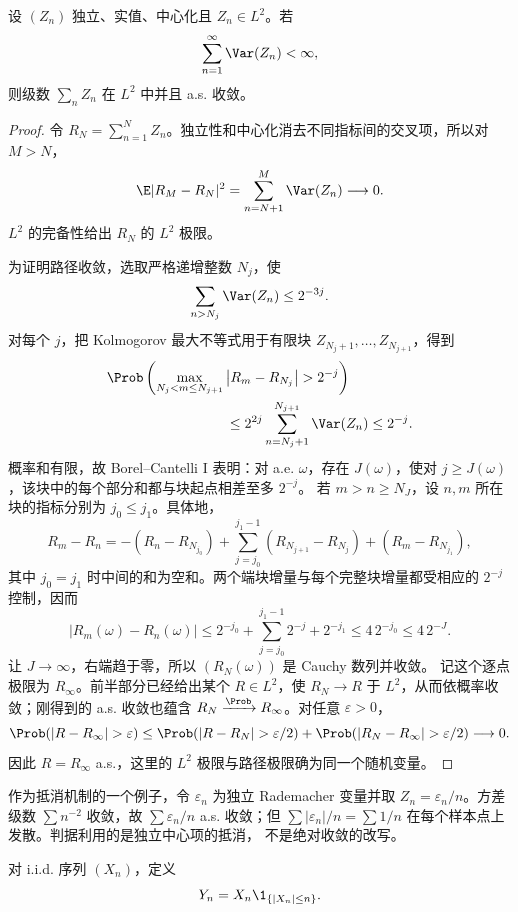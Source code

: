 \begin{theorem}\label{theorem:5-4-2-kolmogorov-series}
设 $(Z_n)$ 独立、实值、中心化且 $Z_n\in L^2$。若
\[
 \sum_{n=1}^{\infty}\Var(Z_n)<\infty,
\]
则级数 $\sum_nZ_n$ 在 $L^2$ 中并且 a.s. 收敛。
\end{theorem}

\begin{proof}
令 $R_N=\sum_{n=1}^NZ_n$。独立性和中心化消去不同指标间的交叉项，所以对 $M>N$，
\[
 \E|R_M-R_N|^2=\sum_{n=N+1}^M\Var(Z_n)\longrightarrow0.
\]
$L^2$ 的完备性给出 $R_N$ 的 $L^2$ 极限。

为证明路径收敛，选取严格递增整数 $N_j$，使
\[
 \sum_{n>N_j}\Var(Z_n)\leq2^{-3j}.
\]
对每个 $j$，把 Kolmogorov 最大不等式用于有限块
$Z_{N_j+1},\dots,Z_{N_{j+1}}$，得到
\begin{align*}
 &\Prob\left(
 \max_{N_j<m\leq N_{j+1}}
 \left|R_m-R_{N_j}\right|>2^{-j}
 \right)\\
 &\hspace{30mm}\leq
 2^{2j}\sum_{n=N_j+1}^{N_{j+1}}\Var(Z_n)
 \leq2^{-j}.
\end{align*}
概率和有限，故 Borel--Cantelli I 表明：对 a.e. $\omega$，存在 $J(\omega)$，使对
$j\geq J(\omega)$，该块中的每个部分和都与块起点相差至多 $2^{-j}$。
若 $m>n\geq N_J$，设 $n,m$ 所在块的指标分别为 $j_0\leq j_1$。具体地，
\[
 R_m-R_n
 =-(R_n-R_{N_{j_0}})
  +\sum_{j=j_0}^{j_1-1}(R_{N_{j+1}}-R_{N_j})
  +(R_m-R_{N_{j_1}}),
\]
其中 $j_0=j_1$ 时中间的和为空和。两个端块增量与每个完整块增量都受相应的
$2^{-j}$ 控制，因而
\[
 |R_m(\omega)-R_n(\omega)|
 \leq2^{-j_0}+\sum_{j=j_0}^{j_1-1}2^{-j}+2^{-j_1}
 \leq4\,2^{-j_0}\leq4\,2^{-J}.
\]
让 $J\to\infty$，右端趋于零，所以 $(R_N(\omega))$ 是 Cauchy 数列并收敛。
记这个逐点极限为 $R_\infty$。前半部分已经给出某个 $R\in L^2$，使
$R_N\to R$ 于 $L^2$，从而依概率收敛；刚得到的 a.s. 收敛也蕴含
$R_N\xrightarrow{\Prob}R_\infty$。对任意 $\varepsilon>0$，
\[
 \Prob(|R-R_\infty|>\varepsilon)
 \leq
 \Prob(|R-R_N|>\varepsilon/2)
 +\Prob(|R_N-R_\infty|>\varepsilon/2)\longrightarrow0.
\]
因此 $R=R_\infty$ a.s.，这里的 $L^2$ 极限与路径极限确为同一个随机变量。
\end{proof}

作为抵消机制的一个例子，令 $\varepsilon_n$ 为独立 Rademacher 变量并取
$Z_n=\varepsilon_n/n$。方差级数 $\sum n^{-2}$ 收敛，故
$\sum\varepsilon_n/n$ a.s. 收敛；但
$\sum|\varepsilon_n|/n=\sum1/n$ 在每个样本点上发散。判据利用的是独立中心项的抵消，
不是绝对收敛的改写。

\begin{definition}[逐项截断]\label{def:5-4-2-2}
对 i.i.d. 序列 $(X_n)$，定义
\[
 Y_n=X_n\1_{\{|X_n|\leq n\}}.
\]
\end{definition}


